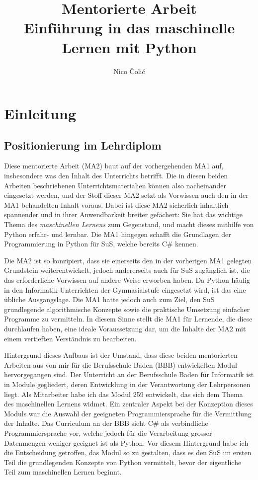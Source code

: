 \documentclass[twocolumn]{article}
\title{\textbf{Mentorierte Arbeit}\\
\vspace{0.5cm}
Einführung in das maschinelle Lernen mit Python}
\author{Nico Čolić}
\begin{document}
\maketitle

\section{Einleitung}

\subsection{Positionierung im Lehrdiplom}
Diese mentorierte Arbeit (MA2) baut auf der vorhergehenden MA1 auf, insbesondere was den Inhalt des Unterrichts betrifft. Die in diesen beiden Arbeiten beschriebenen Unterrichtsmaterialien können also nacheinander eingesetzt werden, und der Stoff dieser MA2 setzt als Vorwissen auch den in der MA1 behandelten Inhalt voraus. Dabei ist diese MA2 sicherlich inhaltlich spannender und in ihrer Anwendbarkeit breiter gefächert: Sie hat das wichtige Thema des \textit{maschinellen Lernens} zum Gegenstand, und macht dieses mithilfe von Python erfahr- und lernbar. Die MA1 hingegen schafft die Grundlagen der Programmierung in Python für SuS, welche bereits C\# kennen. 

Die MA2 ist so konzipiert, dass sie einerseits den in der vorherigen MA1 gelegten Grundstein weiterentwickelt, jedoch andererseits auch für SuS zugänglich ist, die das erforderliche Vorwissen auf andere Weise erworben haben. Da Python häufig  in den Informatik-Unterrichten der Gymnasialstufe eingesetzt wird, ist das eine übliche Ausgangslage. Die MA1 hatte jedoch auch zum Ziel, den SuS grundlegende algorithmische Konzepte sowie die praktische Umsetzung einfacher Programme zu vermitteln. In diesem Sinne stellt die MA1 für Lernende, die diese durchlaufen haben, eine ideale Voraussetzung dar, um die Inhalte der MA2 mit einem vertieften Verständnis zu bearbeiten.

Hintergrund dieses Aufbaus ist der Umstand, dass diese beiden mentorierten Arbeiten aus von mir für die Berufsschule Baden (BBB) entwickelten Modul hervorgegangen sind. Der Unterricht an der Berufsschule Baden für Informatik ist in Module gegliedert, deren Entwicklung in der Verantwortung der Lehrpersonen liegt. Als Mitarbeiter habe ich das Modul 259 entwickelt, das sich dem Thema des maschinellen Lernens widmet. Ein zentraler Aspekt bei der Konzeption dieses Moduls war die Auswahl der geeigneten Programmiersprache für die Vermittlung der Inhalte. Das Curriculum an der BBB sieht C\# als verbindliche Programmiersprache vor, welche jedoch für die Verarbeitung grosser Datenmengen weniger geeignet ist als Python. Vor diesem Hintergrund habe ich die Entscheidung getroffen, das Modul so zu gestalten, dass es den SuS im ersten Teil die grundlegenden Konzepte von Python vermittelt, bevor der eigentliche Teil zum maschinellen Lernen beginnt.
\end{document}
